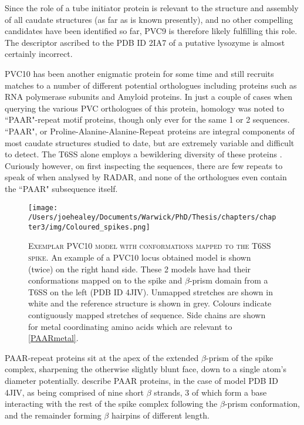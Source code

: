 Since the role of a tube initiator protein is relevant to the structure and assembly of all caudate structures (as far as is known presently), and no other compelling candidates have been identified so far, PVC9 is therefore likely fulfilling this role. The descriptor ascribed to the PDB ID 2IA7 of a putative lysozyme is almost certainly incorrect.

PVC10 has been another enigmatic protein for some time and still recruits matches to a number of different potential orthologues including proteins such as RNA polymerase subunits and Amyloid proteins. In just a couple of cases when querying the various PVC orthologues of this protein, homology was noted to ``PAAR"-repeat motif proteins, though only ever for the same 1 or 2 sequences. ``PAAR", or Proline-Alanine-Alanine-Repeat proteins are integral components of most caudate structures studied to date, but are extremely variable and difficult to detect. The T6SS alone employs a bewildering diversity of these proteins \citep{Shneider2013}. Curiously however, on first inspecting the sequences, there are few repeats to speak of when analysed by RADAR, and none of the orthologues even contain the ``PAAR" subsequence itself.


\begin{figure}[h!]
\centering
\texttt{[image: /Users/joehealey/Documents/Warwick/PhD/Thesis/chapters/chapter3/img/Coloured\_spikes.png]}
\captionsetup{singlelinecheck=off, justification=justified, font=footnotesize, aboveskip=10pt}
\caption[A putative conformation of spike tip proteins]{\textsc{\normalsize Exemplar PVC10 model with conformations mapped to the T6SS spike.}\vspace{0.1cm} \newline An example of a PVC10 locus obtained model is shown (twice) on the right hand side. These 2 models have had their conformations mapped on to the spike and $\beta$-prism domain from a T6SS on the left (PDB ID 4JIV). Unmapped stretches are shown in white and the reference structure is shown in grey. Colours indicate contiguously mapped stretches of sequence. Side chains are shown for metal coordinating amino acids which are relevant to \vref{PAARmetal}.}  
	\label{PAAR}
\end{figure}


PAAR-repeat proteins sit at the apex of the extended $\beta$-prism of the spike complex, sharpening the otherwise slightly blunt face, down to a single atom's diameter potentially. \cite{Shneider2013} describe PAAR proteins, in the case of model PDB ID 4JIV, as being comprised of nine short $\beta$ strands, 3 of which form a base interacting with the rest of the spike complex following the $\beta$-prism conformation, and the remainder forming $\beta$ hairpins of different length.

